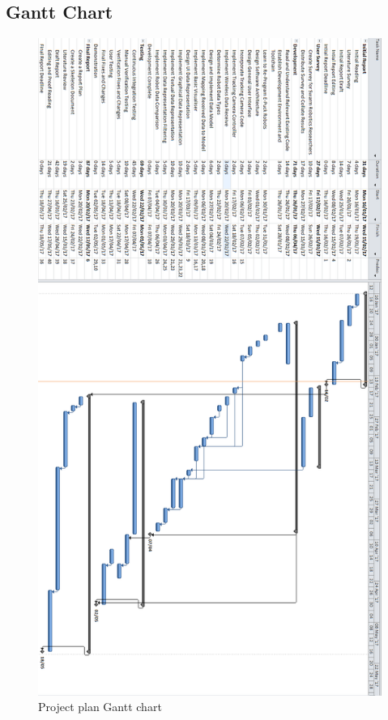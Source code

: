 \documentclass[titlepage,hidelinks,10pt]{article}
\begin{document}
\begin{appendix}
\section{Gantt Chart}\label{app:GantChart}
\begin{figure}[H]
	\begin{center}
	\includegraphics[scale=0.47]{Gant90.png}
	\caption{Project plan Gantt chart}
	\label{fig:GantChart}
	\end{center}
\end{figure}

\end{appendix}
\newpage
\end{document}
